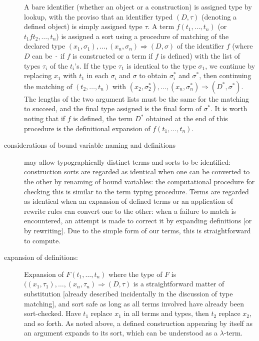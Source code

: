 \documentclass[12pt]{article}
\begin{document}
\begin{description}
A bare identifier (whether an object or a construction) is assigned type by lookup, with the proviso that an identifier typed $(D,\tau)$ (denoting a defined object) is
simply assigned type $\tau$.   A term $f(t_1,\ldots,t_n)$ (or $t_1 f t_2,\ldots,t_n$) is assigned a sort using a procedure of matching of the declared type
$(x_1,\sigma_1),\ldots,(x_n,\sigma_n) \Rightarrow (D,\sigma)$ of the identifier $f$ (where $D$ can be {\tt -} if $f$ is constructed or a term if $f$ is defined) with the list of types $\tau_i$ of the $t_i$'s.
If the type $\tau_1$ is identical to the type $\sigma_1$, we continue by replacing $x_1$ with $t_1$ in each $\sigma_i$ and $\sigma$ to obtain $\sigma_i^*$ and $\sigma^*$,
then continuing the matching of $(t_2,\ldots,t_n)$ with $(x_2,\sigma^*_2),\ldots,(x_n,\sigma^*_n)\Rightarrow (D^*,\sigma^*)$.  The lengths of the two argument lists must be the same
for the matching to succeed, and the final type assigned is the final form of $\sigma^*$.  It is worth noting that if $f$ is defined, the term $D^*$ obtained at the end of this procedure is the definitional expansion of $f(t_1,\ldots,t_n)$.

\item[considerations of bound variable naming and definitions]  may allow typographically distinct terms and sorts to be identified:  construction sorts are regarded as identical when one can be converted to the other by renaming of bound variables:  the computational procedure for checking this is similar to the term typing procedure.   Terms are regarded as identical when an expansion of defined terms or an application of rewrite rules can convert one to the other:  when a failure to match is encountered, an attempt is made to correct it by expanding definitions [or by rewriting].   Due to the simple form of our terms, this is straightforward to compute.

\item[expansion of definitions:]  Expansion of $F(t_1,\ldots,t_n)$ where the type of $F$ is $((x_1,\tau_1),\ldots,(x_n,\tau_n) \Rightarrow (D,\tau)$ is a straightforward matter of substitution [already described incidentally in the discussion of type matching], and sort safe as long as all terms involved have already been sort-checked.  Have $t_1$ replace $x_1$ in all terms and types, then $t_2$ replace $x_2$, and so forth.
As noted above, a defined construction appearing by itself as an argument expands to its sort, which can be understood as a $\lambda$-term.


\end{description}
\end{document}
